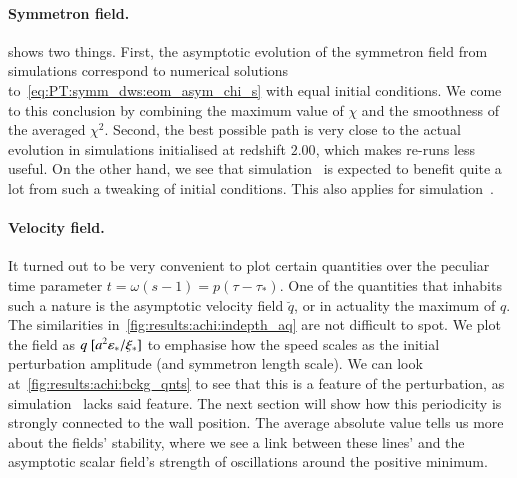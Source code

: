 \paragraph{Symmetron field.} %
 shows two things. First, the asymptotic evolution of the symmetron field from simulations correspond to numerical solutions to~\cref{eq:PT:symm_dws:eom_asym_chi_s} with equal initial conditions. We come to this conclusion by combining the maximum value of $\chi$ and the smoothness of the averaged $\chi^2$. Second, the best possible path %
is very close to the actual evolution in simulations initialised at redshift $2.00$, which makes re-runs less useful. On the other hand, we see that simulation~ is expected to benefit quite a lot from such a tweaking of initial conditions. This also applies for simulation~.


\paragraph{Velocity field.} %
It turned out to be very convenient to plot certain quantities over the peculiar time parameter $t = \omega(s-1)=p(\tau-\tau_\ast)$. One of the quantities that inhabits such a nature is the asymptotic velocity field $\breve{q}$, or in actuality the maximum of $q$. %
The similarities in~\cref{fig:results:achi:indepth_aq} are not difficult to spot. We plot the field as $q~[a^2 \varepsilon_\ast/\xi_\ast]$ %
to emphasise how the speed scales as the initial perturbation amplitude (and symmetron length scale). We can look at~\cref{fig:results:achi:bckg_qnts} to see that this is a feature of the perturbation, as simulation~ lacks said feature. The next section will show how this periodicity is strongly connected to the wall position. The average absolute value tells us more about the fields' stability, where we see a link between these lines' and the asymptotic scalar field's strength of oscillations around the positive minimum.






